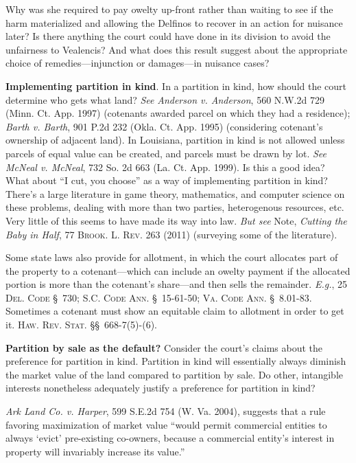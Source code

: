 Why was she required to pay owelty up-front rather than waiting to see if the
harm materialized and allowing the Delfinos to recover in an action for
nuisance later? Is there anything the court could have done in its division to
avoid the unfairness to Vealencis? And what does this result suggest about the
appropriate choice of remedies---injunction or damages---in nuisance cases?



\item \textbf{Implementing partition in kind}. In a partition in kind, how
should the court determine who gets what land? \textit{See} \emph{Anderson v.
Anderson}, 560 N.W.2d 729 (Minn. Ct. App. 1997) (cotenants awarded parcel on
which they had a residence); \emph{Barth v. Barth}, 901 P.2d 232 (Okla. Ct. App.
1995) (considering cotenant's ownership of adjacent land). In Louisiana,
partition in kind is not allowed unless parcels of equal value can be created,
and parcels must be drawn by lot. \emph{See} \emph{McNeal v. McNeal}, 732 So. 2d
663 (La. Ct. App. 1999). Is this a good idea? What about ``I cut, you choose''
as a way of implementing partition in kind? There's a large literature in game
theory, mathematics, and computer science on these problems, dealing with more
than two parties, heterogenous resources, etc. Very little of this seems to have
made its way into law. \textit{But see} Note, \textit{Cutting the Baby in Half},
77 \textsc{Brook. L. Rev.} 263 (2011) (surveying some of the literature).


Some state laws also provide for allotment, in which the court allocates part of
the property to a cotenant---which can include an owelty payment if the
allocated portion is more than the cotenant's share---and then sells the
remainder. \emph{E.g.}, 25 \textsc{Del. Code} \S~730; \textsc{S.C. Code Ann.}
\S~15-61-50; \textsc{Va.
Code Ann.} \S~8.01-83. Sometimes a cotenant must show an equitable claim to
allotment in order to get it. \textsc{Haw. Rev. Stat.} \S\S~668-7(5)-(6).



\item \textbf{Partition by sale as the default?} Consider the court's
claims about the preference for partition in kind. Partition in kind will
essentially always diminish the market value of the land compared to partition
by sale. Do other, intangible interests nonetheless adequately justify a
preference for partition in kind?


\textit{Ark Land Co. v. Harper}, 599 S.E.2d 754 (W. Va. 2004), suggests that a
rule favoring maximization of market value ``would permit commercial entities
to always `evict' pre-existing co-owners, because a commercial entity's
interest in property will invariably increase its value.''

